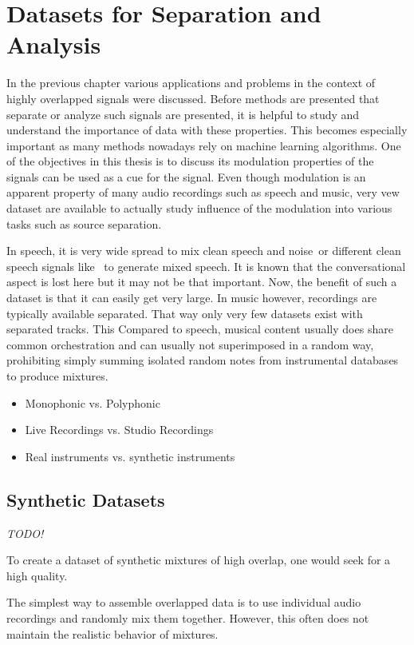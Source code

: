 \chapter{Datasets for Separation and Analysis}

In the previous chapter various applications and problems in the context of highly overlapped signals were discussed.
Before methods are presented that separate or analyze such signals are presented, it is helpful to study and understand the importance of data with these properties.
This becomes especially important as many methods nowadays rely on machine learning algorithms.
One of the objectives in this thesis is to discuss its modulation properties of the signals can be used as a cue for the signal.
Even though modulation is an apparent property of many audio recordings such as speech and music, very vew dataset are available to actually study influence of the modulation into various tasks such as source separation.
\par
In speech, it is very wide spread to mix clean speech and noise~\cite{varga93}or different clean speech signals like~\cite{garofolo93} to generate mixed speech.
It is known that the conversational aspect is lost here but it may not be that important.
Now, the benefit of such a dataset is that it can easily get very large.
In music however, recordings are typically available separated.
That way only very few datasets exist with separated tracks. This
Compared to speech, musical content usually does share common orchestration and can usually not superimposed in a random way, prohibiting simply summing isolated random notes from instrumental databases to produce mixtures.

\begin{itemize}
  \item Monophonic vs. Polyphonic
  \item Live Recordings vs. Studio Recordings
  \item Real instruments vs. synthetic instruments
\end{itemize}

\section{Synthetic Datasets}

\emph{TODO!}

To create a dataset of synthetic mixtures of high overlap, one would seek for a high quality.

The simplest way to assemble overlapped data is to use individual audio recordings and randomly mix them together.
However, this often does not maintain the realistic behavior of mixtures.

